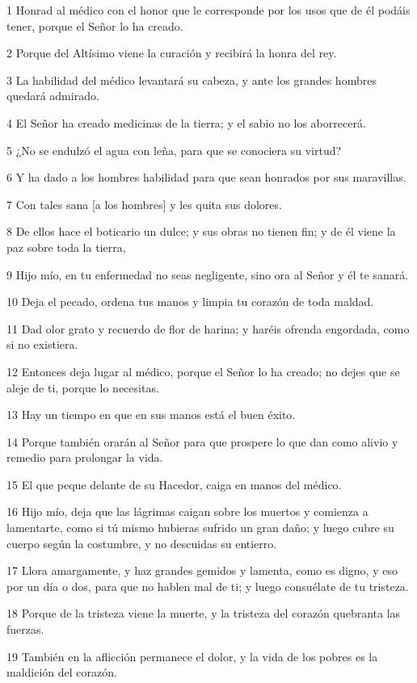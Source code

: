 \par 1 Honrad al médico con el honor que le corresponde por los usos que de él podáis tener, porque el Señor lo ha creado.
\par 2 Porque del Altísimo viene la curación y recibirá la honra del rey.
\par 3 La habilidad del médico levantará su cabeza, y ante los grandes hombres quedará admirado.
\par 4 El Señor ha creado medicinas de la tierra; y el sabio no los aborrecerá.
\par 5 ¿No se endulzó el agua con leña, para que se conociera su virtud?
\par 6 Y ha dado a los hombres habilidad para que sean honrados por sus maravillas.
\par 7 Con tales sana [a los hombres] y les quita sus dolores.
\par 8 De ellos hace el boticario un dulce; y sus obras no tienen fin; y de él viene la paz sobre toda la tierra,
\par 9 Hijo mío, en tu enfermedad no seas negligente, sino ora al Señor y él te sanará.
\par 10 Deja el pecado, ordena tus manos y limpia tu corazón de toda maldad.
\par 11 Dad olor grato y recuerdo de flor de harina; y haréis ofrenda engordada, como si no existiera.
\par 12 Entonces deja lugar al médico, porque el Señor lo ha creado; no dejes que se aleje de ti, porque lo necesitas.
\par 13 Hay un tiempo en que en sus manos está el buen éxito.
\par 14 Porque también orarán al Señor para que prospere lo que dan como alivio y remedio para prolongar la vida.
\par 15 El que peque delante de su Hacedor, caiga en manos del médico.
\par 16 Hijo mío, deja que las lágrimas caigan sobre los muertos y comienza a lamentarte, como si tú mismo hubieras sufrido un gran daño; y luego cubre su cuerpo según la costumbre, y no descuidas su entierro.
\par 17 Llora amargamente, y haz grandes gemidos y lamenta, como es digno, y eso por un día o dos, para que no hablen mal de ti; y luego consuélate de tu tristeza.
\par 18 Porque de la tristeza viene la muerte, y la tristeza del corazón quebranta las fuerzas.
\par 19 También en la aflicción permanece el dolor, y la vida de los pobres es la maldición del corazón.
